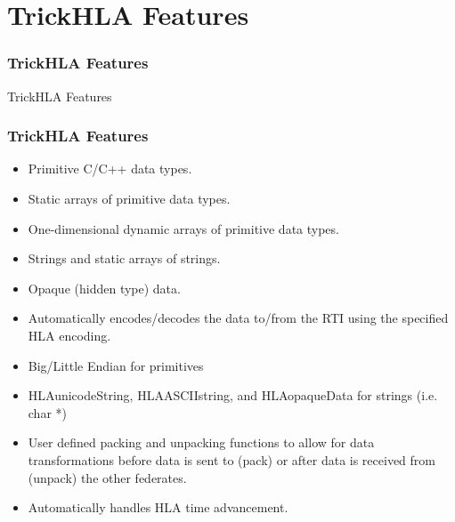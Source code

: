 \documentclass{beamer}
\begin{document}
   \section{TrickHLA Features}

   \begin{frame}
      \frametitle{TrickHLA Features}
      \begin{center}
      \Huge{TrickHLA Features}
      \end{center}
   \end{frame}
   
   \begin{frame}
      \frametitle{TrickHLA Features}
      \begin{itemize}
         \item Primitive C/C++ data types.
         \item Static arrays of primitive data types.
         \item One-dimensional dynamic arrays of primitive data types.
         \item Strings and static arrays of strings.
         \item Opaque (hidden type) data.
         \item Automatically encodes/decodes the data to/from the RTI using the specified HLA encoding.
         \item Big/Little Endian for primitives
         \item HLAunicodeString, HLAASCIIstring, and HLAopaqueData for strings (i.e. char *)
         \item User defined packing and unpacking functions to allow for data transformations before data is sent to (pack) or after data is received from (unpack) the other federates.
         \item Automatically handles HLA time advancement.
      \end{itemize}
   \end{frame}
   
\end{document}

